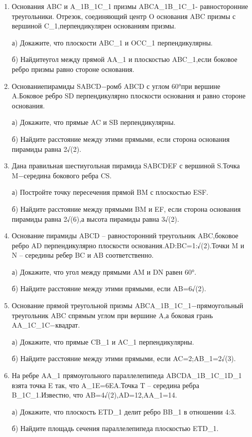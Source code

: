 \documentclass[12pt]{article}
\begin{document}
\begin{enumerate}
  \par б) Найдитеугол между прямой SM и плоскостью CSD.
  \item Основания ABC и A\_1B\_1C\_1 призмы ABCA\_1B\_1C\_1- равносторонние треугольники. Отрезок, соединяющий центр O основания ABC призмы с вершиной C\_1,перпендикулярен основаниям призмы.
  \par а) Докажите, что плоскости ABC\_1 и OCC\_1 перпендикулярны.
  \par б) Найдитеугол между прямой AA\_1 и плоскостью ABC\_1,если боковое ребро призмы равно стороне основания.
  \item Основаниепирамиды SABCD−ромб ABCD с углом 60°при вершине A.Боковое ребро SD перпендикулярно плоскости основания и равно стороне основания.
  \par а) Докажите, что прямые AC и SB перпендикулярны.
  \par б) Найдите расстояние между этими прямыми, если сторона основания пирамиды равна 2√(2).
  \item Дана правильная шестиугольная пирамида SABCDEF с вершиной S.Точка M−середина бокового ребра CS.
  \par а) Постройте точку пересечения прямой BM с плоскостью ESF.
  \par б) Найдите расстояние между прямыми BM и EF, если сторона основания пирамиды равна 2√(6),а высота пирамиды равна 3√(2).
  \item Основание пирамиды ABCD – равносторонний треугольник ABC,боковое ребро AD перпендикулярно плоскости основания.AD:BC=1:√(2).Точки M и N – середины ребер BC и AB соответственно.
  \par а) Докажите, что угол между прямыми AM и DN равен 60°.
  \par б) Найдите расстояние между этими прямыми, если AB=6√(2).
  \item Основание прямой треугольной призмы ABCA\_1B\_1C\_1−прямоугольный треугольник ABC спрямым углом при вершине A,а боковая грань AA\_1C\_1C−квадрат.
  \par а) Докажите, что прямые CB\_1 и AC\_1 перпендикулярны.
  \par б) Найдите расстояние между этими прямыми, если AC=2;AB\_1=2√(3).
  \item На ребре AA\_1 прямоугольного параллелепипеда ABCDA\_1B\_1C\_1D\_1 взята точка E так, что A\_1E=6EA.Точка T – середина ребра B\_1C\_1.Известно, что AB=4√(2),AD=12,AA\_1=14.
  \par а) Докажите, что плоскость ETD\_1 делит ребро BB\_1 в отношении 4:3.
  \par б) Найдите площадь сечения параллелепипеда плоскостью ETD\_1.

\end{enumerate}
\end{document}
